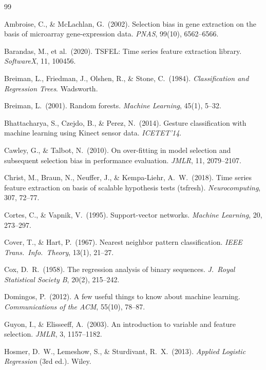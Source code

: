 \documentclass[11pt,a4paper]{article}
\begin{document}
\begin{thebibliography}{99}

Ambroise, C., \& McLachlan, G.\ (2002). Selection bias in gene
extraction on the basis of microarray gene-expression data.
\textit{PNAS}, 99(10), 6562--6566.

Barandas, M., et al.\ (2020). TSFEL: Time series feature extraction
library. \textit{SoftwareX}, 11, 100456.

Breiman, L., Friedman, J., Olshen, R., \& Stone, C.\ (1984).
\textit{Classification and Regression Trees}. Wadsworth.

Breiman, L.\ (2001). Random forests.
\textit{Machine Learning}, 45(1), 5--32.

Bhattacharya, S., Czejdo, B., \& Perez, N.\ (2014).
Gesture classification with machine learning using Kinect sensor data.
\textit{ICETET'14}.

Cawley, G., \& Talbot, N.\ (2010). On over-fitting in model selection
and subsequent selection bias in performance evaluation.
\textit{JMLR}, 11, 2079--2107.

Christ, M., Braun, N., Neuffer, J., \& Kempa-Liehr, A.~W.\ (2018).
Time series feature extraction on basis of scalable hypothesis tests
(tsfresh). \textit{Neurocomputing}, 307, 72--77.

Cortes, C., \& Vapnik, V.\ (1995). Support-vector networks.
\textit{Machine Learning}, 20, 273--297.

Cover, T., \& Hart, P.\ (1967). Nearest neighbor pattern
classification. \textit{IEEE Trans.\ Info.\ Theory}, 13(1), 21--27.

Cox, D.~R.\ (1958). The regression analysis of binary sequences.
\textit{J.\ Royal Statistical Society B}, 20(2), 215--242.

Domingos, P.\ (2012). A few useful things to know about machine
learning. \textit{Communications of the ACM}, 55(10), 78--87.

Guyon, I., \& Elisseeff, A.\ (2003). An introduction to variable and
feature selection. \textit{JMLR}, 3, 1157--1182.

Hosmer, D.~W., Lemeshow, S., \& Sturdivant, R.~X.\ (2013).
\textit{Applied Logistic Regression} (3rd ed.). Wiley.


\end{thebibliography}
\end{document}
